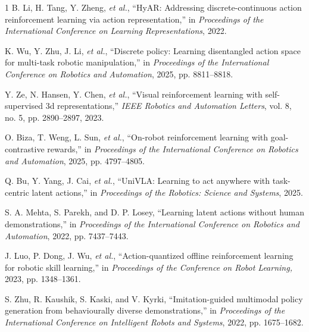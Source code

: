 \documentclass[letterpaper, 10 pt, conference]{ieeeconf}
\begin{document}
\begin{thebibliography}{1}
    B. Li, H. Tang, Y. Zheng, \textit{et al.}, ``Hy{{AR}}: Addressing discrete-continuous action reinforcement learning via action representation,'' in \emph{Proceedings of the International Conference on Learning Representations}, 2022.

    K. Wu, Y. Zhu, J. Li, \textit{et al.}, ``Discrete policy: Learning disentangled action space for multi-task robotic manipulation,'' in \emph{Proceedings of the International Conference on Robotics and Automation}, 2025, pp. 8811--8818.

    Y. Ze, N. Hansen, Y. Chen, \textit{et al.}, ``Visual reinforcement learning with self-supervised 3d representations,'' \emph{IEEE Robotics and Automation Letters}, vol. 8, no. 5, pp. 2890--2897, 2023.



    O. Biza, T. Weng, L. Sun, \textit{et al.}, ``On-robot reinforcement learning with goal-contrastive rewards,'' in \emph{Proceedings of the International Conference on Robotics and Automation}, 2025, pp. 4797--4805.

    Q. Bu, Y. Yang, J. Cai, \textit{et al.}, ``Uni{{VLA}}: Learning to act anywhere with task-centric latent actions,'' in \emph{Proceedings of the Robotics: Science and Systems}, 2025.

    S. A. Mehta, S. Parekh, and D. P. Losey, ``Learning latent actions without human demonstrations,'' in \emph{Proceedings of the International Conference on Robotics and Automation}, 2022, pp. 7437--7443.

    J. Luo, P. Dong, J. Wu, \textit{et al.}, ``Action-quantized offline reinforcement learning for robotic skill learning,'' in \emph{Proceedings of the Conference on Robot Learning,} 2023, pp. 1348--1361.

    S. Zhu, R. Kaushik, S. Kaski, and V. Kyrki, ``Imitation-guided multimodal policy generation from behaviourally diverse demonstrations,'' in \emph{Proceedings of the International Conference on Intelligent Robots and Systems}, 2022, pp. 1675--1682.
    

\end{thebibliography}
\end{document}
